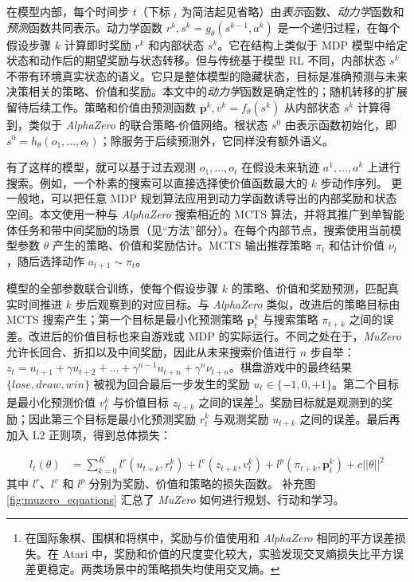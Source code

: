 \documentclass{article}
\newcommand{\muzero}{\emph{MuZero}}
\newcommand{\alphazero}{\emph{AlphaZero}}
\begin{document}
在模型内部，每个时间步 $t$（下标 $_t$ 为简洁起见省略）由\emph{表示}函数、\emph{动力学}函数和\emph{预测}函数共同表示。动力学函数 $r^k, s^k = g_\theta(s^{k-1}, a^k)$ 是一个递归过程，在每个假设步骤 $k$ 计算即时奖励 $r^k$ 和内部状态 $s^k$。它在结构上类似于 MDP 模型中给定状态和动作后的期望奖励与状态转移\cite{puterman:MDP}。但与传统基于模型 RL\cite{sutton:book} 不同，内部状态 $s^k$ 不带有环境真实状态的语义。它只是整体模型的隐藏状态，目标是准确预测与未来决策相关的策略、价值和奖励。本文中的\emph{动力学}函数是确定性的；随机转移的扩展留待后续工作。策略和价值由预测函数 $\mathbf{p}^k, v^k = f_\theta(s^k)$ 从内部状态 $s^k$ 计算得到，类似于 \alphazero{} 的联合策略-价值网络。根状态 $s^0$ 由表示函数初始化，即 $s^0 = h_\theta(o_1, ..., o_t)$；除服务于后续预测外，它同样没有额外语义。

有了这样的模型，就可以基于过去观测 $o_1, ..., o_t$ 在假设未来轨迹 $a^1, ..., a^k$ 上进行搜索。例如，一个朴素的搜索可以直接选择使价值函数最大的 $k$ 步动作序列。%
更一般地，可以把任意 MDP 规划算法应用到动力学函数诱导出的内部奖励和状态空间。本文使用一种与 \alphazero{} 搜索相近的 MCTS 算法，并将其推广到单智能体任务和带中间奖励的场景（见“方法”部分）。在每个内部节点，搜索使用当前模型参数 $\theta$ 产生的策略、价值和奖励估计。MCTS 输出推荐策略 $\pi_t$ 和估计价值 $\nu_t$，随后选择动作 $a_{t+1} \sim \pi_t$。

模型的全部参数联合训练，使每个假设步骤 $k$ 的策略、价值和奖励预测，匹配真实时间推进 $k$ 步后观察到的对应目标。与 \alphazero{} 类似，改进后的策略目标由 MCTS 搜索产生；第一个目标是最小化预测策略 $\mathbf{p}_t^k$ 与搜索策略 $\pi_{t+k}$ 之间的误差。改进后的价值目标也来自游戏或 MDP 的实际运行。不同之处在于，\muzero{} 允许长回合、折扣以及中间奖励，因此从未来搜索价值进行 $n$ 步自举：
$z_t = u_{t+1} + \gamma u_{t+2} + ... + \gamma^{n-1} u_{t+n} + \gamma^n \nu_{t+n}$。棋盘游戏中的最终结果 $\{lose, draw, win\}$ 被视为回合最后一步发生的奖励 $u_t \in \{ -1, 0, +1 \}$。第二个目标是最小化预测价值 $v^k_t$ 与价值目标 $z_{t+k}$ 之间的误差\footnote{在国际象棋、围棋和将棋中，奖励与价值使用和 \alphazero{} 相同的平方误差损失。在 Atari 中，奖励和价值的尺度变化较大，实验发现交叉熵损失比平方误差更稳定。两类场景中的策略损失均使用交叉熵。}。奖励目标就是观测到的奖励；因此第三个目标是最小化预测奖励 $r^k_t$ 与观测奖励 $u_{t+k}$ 之间的误差。最后再加入 L2 正则项，得到总体损失：

\begin{align}
l_t(\theta) &= \sum_{k=0}^K l^r (u_{t+k}, r_t^k) + l^v(z_{t+k}, v^k_t) + l^p(\pi_{t+k}, \mathbf{p}^k_t) + c ||\theta||^2
\label{muzero_eqn}
\end{align}
%
其中 $l^r$、$l^v$ 和 $l^p$ 分别为奖励、价值和策略的损失函数。
补充图\ref{fig:muzero_equations} 汇总了 \muzero{} 如何进行规划、行动和学习。
\end{document}
